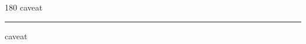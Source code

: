 
\begin{frame}
\begin{center}
\begin{turn}{180}
{\fontsize{2.5cm}{1em}\selectfont caveat}
\end{turn}
\vspace{1em}\par  
\hrule
\vspace{1em}\par  
{\fontsize{2.5cm}{1em}\selectfont caveat}
\end{center}
\end{frame}
